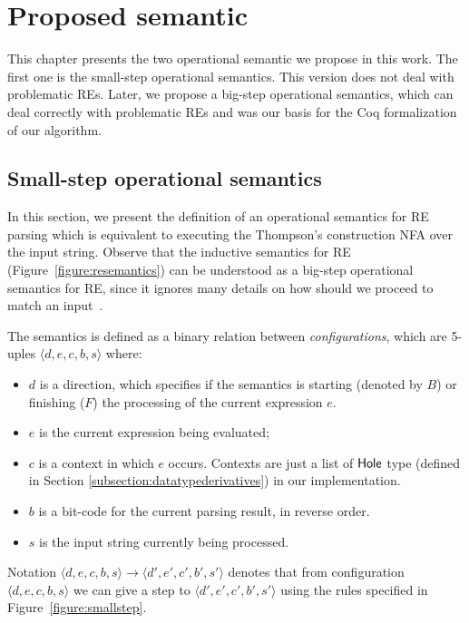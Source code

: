 \documentclass[oneside,12pt]{scrbook}
\theoremstyle{definition}
\newcommand{\D}[1]{\blue{\mathsf{#1}}}
\newcommand{\conf}[1]{\ensuremath{\langle #1 \rangle}}
\theoremstyle{plain}
\theoremstyle{definition}
\begin{document}
\chapter{Proposed semantic}
\label{chapter:proposedsemantic}

This chapter presents the two operational semantic we propose in this work. The first one is the small-step operational semantics. This version does not deal with problematic REs. Later, we propose a big-step operational semantics, which can deal correctly with problematic REs and was our basis for the Coq formalization of our algorithm. %

\section{Small-step operational semantics}
\label{section:smallstepsemantics}

In this section, we present the definition of an operational semantics for RE parsing which is
equivalent to executing the Thompson's construction NFA over the input string. Observe that
the inductive semantics for RE (Figure~\ref{figure:resemantics}) can be understood as a big-step
operational semantics for RE, since it ignores many details on how should we proceed to match
an input~\cite{Rathnayake2011}.

The semantics is defined as a binary relation between \emph{configurations}, which are 5-uples
$\conf{d,e,c,b,s}$ where:
\begin{itemize}
	\item $d$ is a direction, which specifies if the semantics is starting (denoted by $B$) or
	finishing ($F$) the processing of the current expression $e$.
	\item $e$ is the current expression being evaluated;
	\item $c$ is a context in which $e$ occurs. Contexts are just a list of
	\ensuremath{\D{Hole}} type (defined in Section \ref{subsection:datatypederivatives}) in our implementation.
	\item $b$ is a bit-code for the current parsing result, in reverse order.
	\item $s$ is the input string currently being processed.
\end{itemize}
Notation $\conf{d,e,c,b,s}\to\conf{d',e',c',b',s'}$ denotes that from
configuration $\conf{d,e,c,b,s}$ we can give a step to $\conf{d',e',c',b',s'}$ using the rules specified in Figure~\ref{figure:smallstep}.
\end{document}
